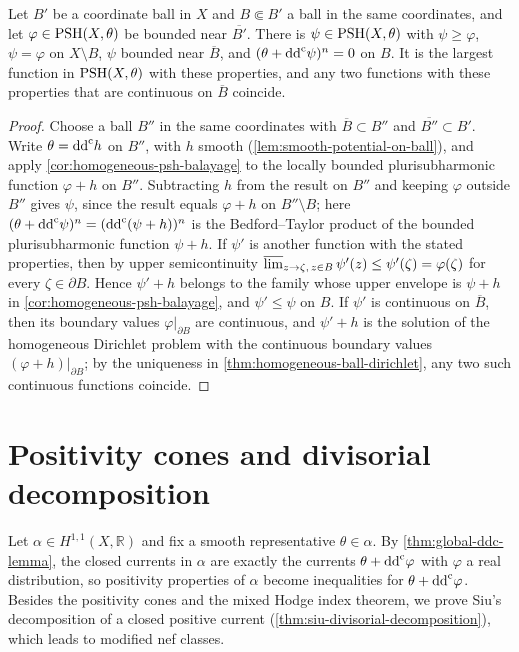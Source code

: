 \begin{corollary}\label{cor:global-psh-balayage}
Let $B'$ be a coordinate ball in $X$ and $B\Subset B'$ a ball in the same coordinates, and let $\varphi\in\mathrm{PSH}(X,\theta)$ be bounded near $\overline{B'}$. There is $\psi\in\mathrm{PSH}(X,\theta)$ with $\psi\geq\varphi$, $\psi=\varphi$ on $X\setminus B$, $\psi$ bounded near $\overline B$, and $(\theta+\mathrm{dd}^{\mathrm{c}}\psi)^n=0$ on $B$. It is the largest function in $\mathrm{PSH}(X,\theta)$ with these properties, and any two functions with these properties that are continuous on $\overline B$ coincide.
\end{corollary}
\begin{proof}
Choose a ball $B''$ in the same coordinates with $\overline B\subset B''$ and $\overline{B''}\subset B'$. Write $\theta=\mathrm{dd}^{\mathrm{c}} h$ on $B''$, with $h$ smooth (\cref{lem:smooth-potential-on-ball}), and apply \cref{cor:homogeneous-psh-balayage} to the locally bounded plurisubharmonic function $\varphi+h$ on $B''$. Subtracting $h$ from the result on $B''$ and keeping $\varphi$ outside $B''$ gives $\psi$, since the result equals $\varphi+h$ on $B''\setminus B$; here $(\theta+\mathrm{dd}^{\mathrm{c}}\psi)^n=(\mathrm{dd}^{\mathrm{c}}(\psi+h))^n$ is the Bedford--Taylor product of the bounded plurisubharmonic function $\psi+h$. If $\psi'$ is another function with the stated properties, then by upper semicontinuity $\varlimsup_{z\to\zeta,\,z\in B}\psi'(z)\leq\psi'(\zeta)=\varphi(\zeta)$ for every $\zeta\in\partial B$. Hence $\psi'+h$ belongs to the family whose upper envelope is $\psi+h$ in \cref{cor:homogeneous-psh-balayage}, and $\psi'\leq\psi$ on $B$. If $\psi'$ is continuous on $\overline B$, then its boundary values $\varphi|_{\partial B}$ are continuous, and $\psi'+h$ is the solution of the homogeneous Dirichlet problem with the continuous boundary values $(\varphi+h)|_{\partial B}$; by the uniqueness in \cref{thm:homogeneous-ball-dirichlet}, any two such continuous functions coincide.
\end{proof}

\section{Positivity cones and divisorial decomposition}
\label{sec:positive-cohomology-cones}
Let $\alpha\in H^{1,1}(X,\mathbb R)$ and fix a smooth representative $\theta\in\alpha$. By \cref{thm:global-ddc-lemma}, the closed currents in $\alpha$ are exactly the currents $\theta+\mathrm{dd}^{\mathrm{c}}\varphi$ with $\varphi$ a real distribution, so positivity properties of $\alpha$ become inequalities for $\theta+\mathrm{dd}^{\mathrm{c}}\varphi$. Besides the positivity cones and the mixed Hodge index theorem, we prove Siu's decomposition of a closed positive current (\cref{thm:siu-divisorial-decomposition}), which leads to modified nef classes.

